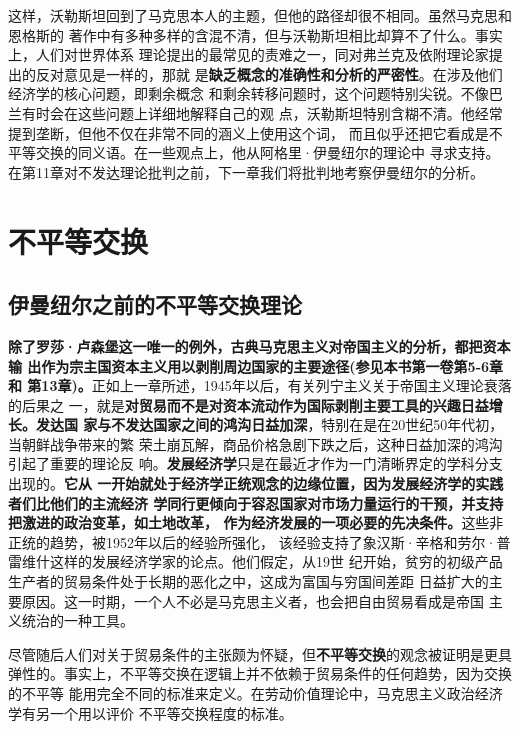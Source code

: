 这样，沃勒斯坦回到了马克思本人的主题，但他的路径却很不相同。虽然马克思和恩格斯的
著作中有多种多样的含混不清，但与沃勒斯坦相比却算不了什么。事实上，人们对世界体系
理论提出的最常见的责难之一，同对弗兰克及依附理论家提出的反对意见是一样的，那就
是\textbf{缺乏概念的准确性和分析的严密性}。在涉及他们经济学的核心问题，即剩余概念
和剩余转移问题时，这个问题特别尖锐。不像巴兰有时会在这些问题上详细地解释自己的观
点，沃勒斯坦特别含糊不清。他经常提到垄断，但他不仅在非常不同的涵义上使用这个词，
而且似乎还把它看成是不平等交换的同义语。在一些观点上，他从阿格里·伊曼纽尔的理论中
寻求支持。在第11章对不发达理论批判之前，下一章我们将批判地考察伊曼纽尔的分析。


\chapter{不平等交换}

\section{伊曼纽尔之前的不平等交换理论}

\textbf{除了罗莎·卢森堡这一唯一的例外，古典马克思主义对帝国主义的分析，都把资本输
  出作为宗主国资本主义用以剥削周边国家的主要途径(参见本书第一卷第5-6章和
  第13章)。}正如上一章所述，1945年以后，有关列宁主义关于帝国主义理论衰落的后果之
一，就是\textbf{对贸易而不是对资本流动作为国际剥削主要工具的兴趣日益增长。发达国
  家与不发达国家之间的鸿沟日益加深}，特别在是在20世纪50年代初，当朝鲜战争带来的繁
荣土崩瓦解，商品价格急剧下跌之后，这种日益加深的鸿沟引起了重要的理论反
响。\textbf{发展经济学}只是在最近才作为一门清晰界定的学科分支出现的。\textbf{它从
  一开始就处于经济学正统观念的边缘位置，因为发展经济学的实践者们比他们的主流经济
  学同行更倾向于容忍国家对市场力量运行的干预，并支持把激进的政治变革，如土地改革，
  作为经济发展的一项必要的先决条件。}这些非正统的趋势，被1952年以后的经验所强化，
该经验支持了象汉斯·辛格和劳尔·普雷维什这样的发展经济学家的论点。他们假定，从19世
纪开始，贫穷的初级产品生产者的贸易条件处于长期的恶化之中，这成为富国与穷国间差距
日益扩大的主要原因。这一时期，一个人不必是马克思主义者，也会把自由贸易看成是帝国
主义统治的一种工具。

尽管随后人们对关于贸易条件的主张颇为怀疑，但\textbf{不平等交换}的观念被证明是更具
弹性的。事实上，不平等交换在逻辑上并不依赖于贸易条件的任何趋势，因为交换的不平等
能用完全不同的标准来定义。在劳动价值理论中，马克思主义政治经济学有另一个用以评价
不平等交换程度的标准。

